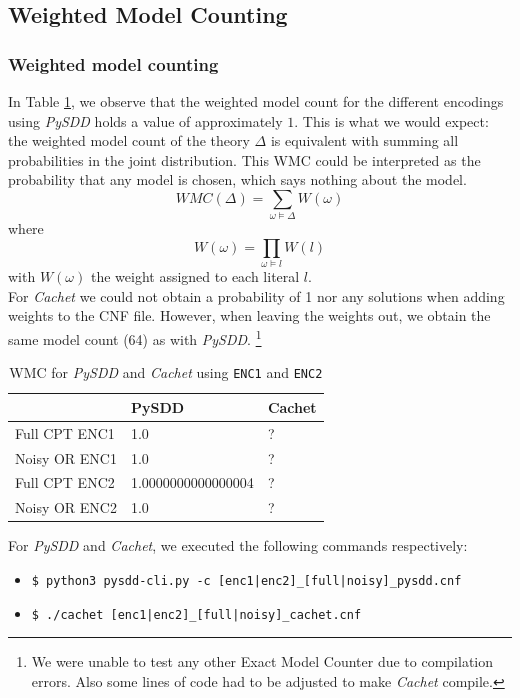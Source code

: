 \documentclass{article}
\begin{document}
\newpage

\subsection{Weighted Model Counting}

\subsubsection{Weighted model counting}
In Table \ref{tab:wmc_pysdd_cachet}, we observe that the weighted model count for the different encodings using  \textit{PySDD} holds a value of approximately $1$. This is what we would expect: the weighted model count of the theory $\Delta$ is equivalent with summing all probabilities in the joint distribution. This WMC could be interpreted as the probability that any model is chosen, which says nothing about the model. 
$$WMC(\Delta) = \sum_{\omega \models \Delta} W(\omega)$$
where
$$W(\omega) = \prod_{\omega \models l}W(l)$$
with $W(\omega)$ the weight assigned to each literal $l$.\cite{chavira}\\
For \textit{Cachet} we could not obtain a probability of 1 nor any solutions when adding weights to the CNF file. However, when leaving the weights out, we obtain the same model count (64) as with \textit{PySDD}.
\footnote{We were unable to test any other Exact Model Counter due to compilation errors. Also some lines of code had to be adjusted to make \textit{Cachet} compile.}
\begin{table}[h]
\centering
\begin{tabular}{l | l l}
					&	PySDD	&		Cachet	\\\hline
	Full CPT ENC1	&	1.0		&		?		\\
	Noisy OR ENC1	&	1.0		&		?		\\
	Full CPT ENC2	&	1.0000000000000004 &	?	\\
	Noisy OR ENC2	&	1.0		&		?		\\
\end{tabular}
\caption{WMC for \textit{PySDD} and \textit{Cachet} using \texttt{ENC1} and \texttt{ENC2}}
\label{tab:wmc_pysdd_cachet}
\end{table}

For \textit{PySDD} and \textit{Cachet}, we executed the following commands respectively:
\begin{itemize}
	\item[] \texttt{\$ python3 pysdd-cli.py -c [enc1|enc2]\_[full|noisy]\_pysdd.cnf}
	\item[] \texttt{\$ ./cachet [enc1|enc2]\_[full|noisy]\_cachet.cnf}
\end{itemize}
\end{document}
